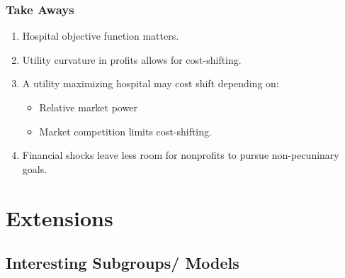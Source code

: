 \documentclass[ucs,9pt]{beamer}
\newcommand{\deriv}[2]{\frac{\mathrm{d}#1}{\mathrm{d}#2}}
\newcommand{\pderiv}[2]{\frac{\partial#1}{\partial#2}}
\begin{document}

\begin{frame}
\frametitle{Take Aways}
\begin{enumerate}
\item Hospital objective function matters.
\item Utility curvature in profits allows for cost-shifting.  
\item A utility maximizing hospital may cost shift depending on: 
\begin{itemize}
\item Relative market power
\item Market competition limits cost-shifting.
\end{itemize}
\item Financial shocks leave less room for nonprofits to pursue non-pecuninary goals.

\end{enumerate}
\end{frame}










\section{Extensions}
\subsection{Interesting Subgroups/ Models}
\end{document}
